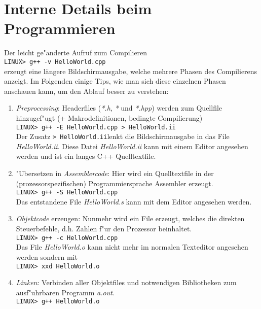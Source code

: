 \section{Interne Details beim Programmieren}
\label{p:1.3}
%
Der leicht ge"anderte Aufruf zum Compilieren	\\
\texttt{LINUX> g++ -v HelloWorld.cpp}		\\
erzeugt eine längere Bildschirmausgabe, welche mehrere
Phasen des Compilierens anzeigt.
Im Folgenden einige Tips, wie man sich diese einzelnen Phasen
anschauen kann, um den Ablauf besser zu verstehen:
%
\begin{enumerate}
  \renewcommand {\labelenumi}{\alph{enumi})}
  \item \emph{Preprocessing}: 
  	Headerfiles
	(\textit{*.h}, \textit{*} und \textit{*.hpp}) werden zum
	Quellfile hinzugef"ugt (+ Makrodefinitionen, bedingte Compilierung) \\
	\texttt{LINUX> g++ -E HelloWorld.cpp > HelloWorld.ii} \\
	Der Zusatz \quad\texttt{> HelloWorld.ii}\quad lenkt die Bildschirmausgabe
	in das File \textit{HelloWorld.ii}. Diese Datei \textit{HelloWorld.ii}
	kann mit einem Editor angesehen werden und ist ein langes C++
	Quelltextfile.
  \item "Ubersetzen in \emph{Assemblercode}: 
  	Hier wird ein Quelltextfile in der
	(prozessorspezifischen) Programmiersprache Assembler erzeugt. \\
	\texttt{LINUX> g++ -S HelloWorld.cpp} \\
	Das entstandene File \textit{HelloWorld.s} kann mit dem
	Editor angesehen werden.
 \item \emph{Objektcode} erzeugen: 
 	Nunmehr wird ein File erzeugt, welches die direkten Steuerbefehle,
	d.h. Zahlen f"ur den Prozessor beinhaltet. \\
	\texttt{LINUX> g++ -c HelloWorld.cpp} \\
	Das File \textit{HelloWorld.o} kann nicht mehr im normalen
	Texteditor angesehen werden sondern mit \\
	\texttt{LINUX> xxd HelloWorld.o}
 \item \emph{Linken}: 
 	Verbinden aller Objektfiles und notwendigen Bibliotheken
	zum ausf"uhrbaren Programm \textit{a.out}\enspace. \\
	\texttt{LINUX> g++ HelloWorld.o}
\end{enumerate}
%
%
%
